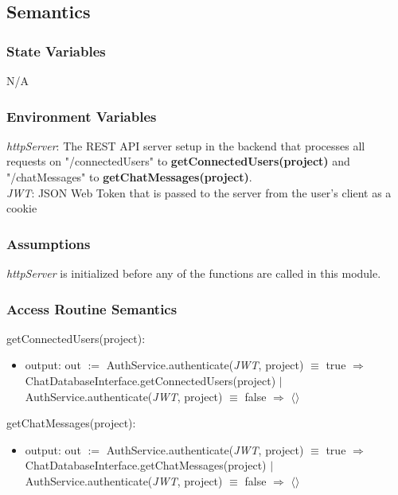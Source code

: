 \documentclass[12pt, titlepage]{article}
\begin{document}
	\subsection{Semantics}
	
	\subsubsection{State Variables}
	
	N/A
	
	\subsubsection{Environment Variables}
	
	\textit{httpServer}: The REST API server setup in the backend that processes all requests on "/connectedUsers" to \textbf{getConnectedUsers(project)} and "/chatMessages" to \textbf{getChatMessages(project)}.\\
	
	\noindent \textit{JWT}: JSON Web Token that is passed to the server from the user's client as a cookie
	
	\subsubsection{Assumptions}
	
	\textit{httpServer} is initialized before any of the functions are called in this module.
	
	\subsubsection{Access Routine Semantics}
	
	\noindent getConnectedUsers(project):
	\begin{itemize}
		
		\item output: out $:=$ AuthService.authenticate(\textit{JWT}, project) $\equiv$ true $\Rightarrow$ ChatDatabaseInterface.getConnectedUsers(project) $|$
		AuthService.authenticate(\textit{JWT}, project) $\equiv$ false $\Rightarrow$ $\langle \rangle$
		
	\end{itemize}
	
	\noindent getChatMessages(project):
	\begin{itemize}
		\item output: out $:=$ AuthService.authenticate(\textit{JWT}, project) $\equiv$ true $\Rightarrow$ ChatDatabaseInterface.getChatMessages(project) $|$
		AuthService.authenticate(\textit{JWT}, project) $\equiv$ false $\Rightarrow$ $\langle \rangle$
	\end{itemize}
	
\end{document}

